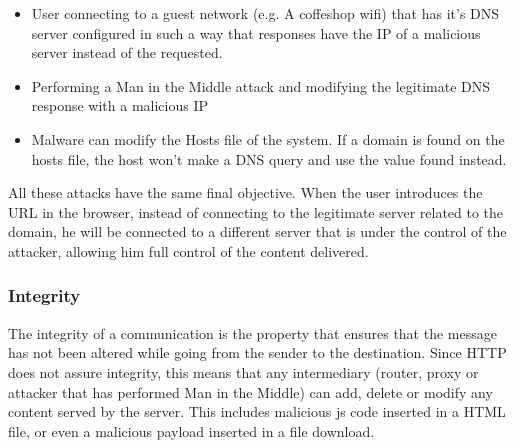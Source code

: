 \begin{itemize}
	\item User connecting to a guest network (e.g. A coffeshop wifi) that has it's DNS server configured in such a way that responses have the IP of a malicious server instead of the requested.
	\item Performing a Man in the Middle attack and modifying the legitimate DNS response with a malicious IP
	\item Malware can modify the Hosts file of the system. If a domain is found on the hosts file, the host won't make a DNS query and use the value found instead.
\end{itemize}

All these attacks have the same final objective. When the user introduces the URL in the browser, instead of connecting to the legitimate server related to the domain, he will be connected to a different server that is under the control of the attacker, allowing him full control of the content delivered.

\subsubsection{Integrity}
The integrity of a communication is the property that ensures that the message has not been altered while going from the sender to the destination. Since HTTP does not assure integrity, this means that any intermediary (router, proxy or attacker that has performed Man in the Middle) can add, delete or modify any content served by the server. This includes malicious js code inserted in a HTML file, or even a malicious payload inserted in a file download.